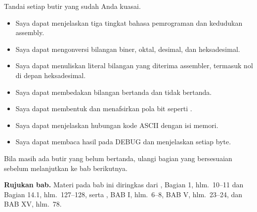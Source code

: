 \begin{checklistbox}
\vspace{1.1em}
Tandai setiap butir yang sudah Anda kuasai.

\begin{itemize}
    \item[\checkbox] Saya dapat menjelaskan tiga tingkat bahasa
          pemrograman dan kedudukan assembly.
    \item[\checkbox] Saya dapat mengonversi bilangan biner, oktal,
          desimal, dan heksadesimal.
    \item[\checkbox] Saya dapat menuliskan literal bilangan yang
          diterima assembler, termasuk nol di depan heksadesimal.
    \item[\checkbox] Saya dapat membedakan bilangan bertanda dan
          tidak bertanda.
    \item[\checkbox] Saya dapat membentuk  dan
          menafsirkan pola bit seperti .
    \item[\checkbox] Saya dapat menjelaskan hubungan kode ASCII dengan
          isi memori.
    \item[\checkbox] Saya dapat membaca hasil  pada DEBUG
          dan menjelaskan setiap byte.
\end{itemize}

\vspace{0.4em}
Bila masih ada butir yang belum bertanda, ulangi bagian yang
bersesuaian sebelum melanjutkan ke bab berikutnya.
\end{checklistbox}

\begin{infobox}
\vspace{1.1em}
\textbf{Rujukan bab.} Materi pada bab ini diringkas dari
\cite{gunawan2019}, Bagian 1, hlm.~10--11 dan Bagian 14.1,
hlm.~127--128, serta \cite{sto2001}, BAB I, hlm.~6--8, BAB V,
hlm.~23--24, dan BAB XV, hlm.~78.
\end{infobox}
